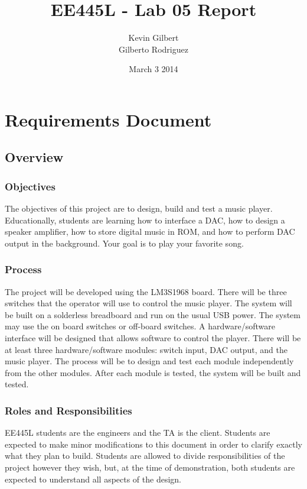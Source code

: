\documentclass[twoside]{article}
\title{EE445L - Lab 05 Report}
\author{Kevin Gilbert\\ Gilberto Rodriguez}
\date{March 3 2014}
\begin{document}
\raggedbottom
\maketitle{}

\section*{Requirements Document}
\subsection*{Overview} 
\subsubsection*{Objectives} 
The objectives of this project are to design, build and test a music player. Educationally, students are learning how to interface a DAC, how to design a speaker amplifier, how to store digital music in ROM, and how to perform DAC output in the background. Your goal is to play your favorite song. 
 
\subsubsection*{Process}
The project will be developed using the LM3S1968 board. There will be three switches that the operator will use to control the music player. The system will be built on a solderless breadboard and run on the usual USB power. The system may use the on board switches or off-board switches. A hardware/software interface will be designed that allows software to control the player. There will be at least three hardware/software modules: switch input, DAC output, and the music player. The process will be to design and test each module independently from the other modules. After each module is tested, the system will be built and tested. 
 
\subsubsection*{Roles and Responsibilities}
EE445L students are the engineers and the TA is the client. Students are expected to make minor modifications to this document in order to clarify exactly what they plan to build. Students are allowed to divide responsibilities of the project however they wish, but, at the time of demonstration, both students are expected to understand all aspects of the design. 
 
\end{document}
